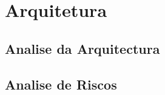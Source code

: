  \chapter{Arquitetura}
\label{sec:arquitetura}


\section{Analise da Arquitectura}
\label{analiseriscos}

\section{Analise de Riscos}
\label{analiseriscos}
\blankpage

\glsresetall
